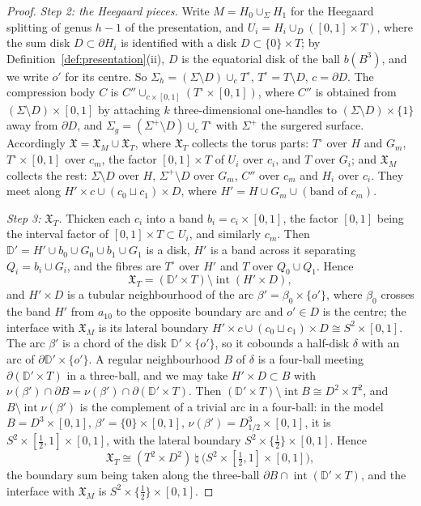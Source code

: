 \documentclass[11pt]{amsart}
\theoremstyle{definition}
\theoremstyle{remark}
\theoremstyle{plain}
\numberwithin{equation}{section}
\begin{document}
\begin{proof}
\emph{Step 2: the Heegaard pieces.} Write $M=H_0\cup_\Sigma H_1$ for the Heegaard
splitting of genus $h-1$ of the presentation, and $U_i=H_i\cup_{D}([0,1]\times T)$, where
the sum disk $D\subset\partial H_i$ is identified with a disk $D\subset\{0\}\times T$; by
Definition~\ref{def:presentation}(ii), $D$ is the equatorial disk of the ball
$b(B^3)$, and we write $o'$ for its centre. So
$\Sigma_h=(\Sigma\setminus D)\cup_c T^\circ$, $T^\circ=T\setminus D$, $c=\partial D$. The compression body $C$ is
$C''\cup_{c\times[0,1]}(T^\circ\times[0,1])$, where $C''$ is obtained from $(\Sigma\setminus D)\times[0,1]$
by attaching $k$ three-dimensional one-handles to $(\Sigma\setminus D)\times\{1\}$ away from
$\partial D$, and $\Sigma_g=(\Sigma^+\setminus D)\cup_cT^\circ$ with $\Sigma^+$ the surgered surface. Accordingly $\mathfrak X=\mathfrak X_M\cup\mathfrak X_T$, where $\mathfrak X_T$
collects the torus parts: $T^\circ$ over $H$ and $G_m$, $T^\circ\times[0,1]$ over $c_m$, the
factor $[0,1]\times T$ of $U_i$ over $c_i$, and $T$ over $G_i$; and $\mathfrak X_M$ collects the
rest: $\Sigma\setminus D$ over $H$, $\Sigma^+\setminus D$ over $G_m$, $C''$ over $c_m$ and $H_i$ over $c_i$. They
meet along $H'\times c\cup(c_0\sqcup c_1)\times D$, where $H'=H\cup G_m\cup(\text{band of }c_m)$.

\emph{Step 3: $\mathfrak X_T$.} Thicken each $c_i$ into a band $b_i=c_i\times[0,1]$, the
factor $[0,1]$ being the interval factor of $[0,1]\times T\subset U_i$, and similarly $c_m$.
Then $\mathbb D'=H'\cup b_0\cup G_0\cup b_1\cup G_1$ is a disk, $H'$ is a band across it separating
$Q_i=b_i\cup G_i$, and the fibres are $T^\circ$ over $H'$ and $T$ over $Q_0\cup Q_1$. Hence
\[
\mathfrak X_T=(\mathbb D'\times T)\setminus\operatorname{int}(H'\times D),
\]
and $H'\times D$ is a tubular neighbourhood of the arc $\beta'=\beta_0\times\{o'\}$, where $\beta_0$
crosses the band $H'$ from $a_{10}$ to the opposite boundary arc and $o'\in D$ is the
centre; the interface with $\mathfrak X_M$ is its lateral boundary
$H'\times c\cup(c_0\sqcup c_1)\times D\cong S^2\times[0,1]$. The arc $\beta'$ is a chord of the disk
$\mathbb D'\times\{o'\}$, so it cobounds a half-disk $\delta$ with an arc of $\partial\mathbb D'\times\{o'\}$. A
regular neighbourhood $B$ of $\delta$ is a four-ball meeting $\partial(\mathbb D'\times T)$ in a
three-ball, and we may take $H'\times D\subset B$ with $\nu(\beta')\cap\partial B=\nu(\beta')\cap\partial(\mathbb D'\times T)$.
Then $(\mathbb D'\times T)\setminus\operatorname{int}B\cong D^2\times T^2$, and $B\setminus\operatorname{int}\nu(\beta')$ is
the complement of a trivial arc in a four-ball: in the model
$B=D^3\times[0,1]$, $\beta'=\{0\}\times[0,1]$, $\nu(\beta')=D^3_{1/2}\times[0,1]$, it is
$S^2\times[\tfrac12,1]\times[0,1]$, with the lateral boundary $S^2\times\{\tfrac12\}\times[0,1]$. Hence
\[
\mathfrak X_T\cong(T^2\times D^2)\ \natural\ \bigl(S^2\times[\tfrac12,1]\times[0,1]\bigr),
\]
the boundary sum being taken along the three-ball $\partial B\cap\operatorname{int}(\mathbb D'\times T)$,
and the interface with $\mathfrak X_M$ is $S^2\times\{\tfrac12\}\times[0,1]$.


\end{proof}
\end{document}
